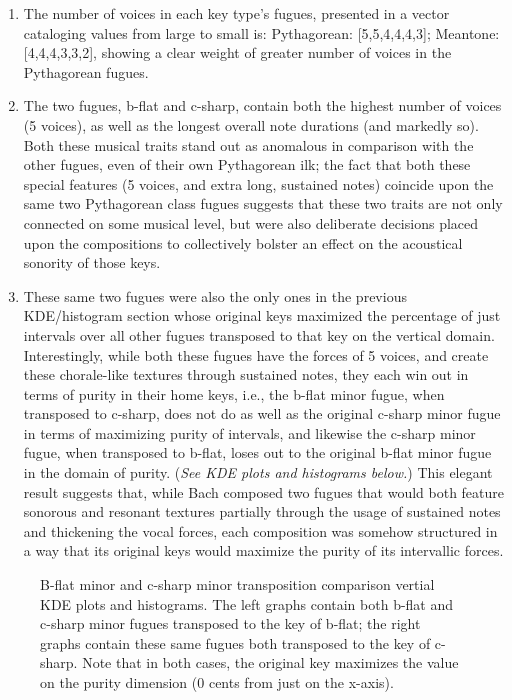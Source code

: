 \begin{enumerate}
\def\labelenumi{\arabic{enumi}.}
\tightlist
\item
  The number of voices in each key type's fugues, presented in a vector
  cataloging values from large to small is: Pythagorean:
  {[}5,5,4,4,4,3{]}; Meantone: {[}4,4,4,3,3,2{]}, showing a clear weight
  of greater number of voices in the Pythagorean fugues.
\item
  The two fugues, b-flat and c-sharp, contain both the highest number of
  voices (5 voices), as well as the longest overall note durations (and
  markedly so). Both these musical traits stand out as anomalous in
  comparison with the other fugues, even of their own Pythagorean ilk;
  the fact that both these special features (5 voices, and extra long,
  sustained notes) coincide upon the same two Pythagorean class fugues
  suggests that these two traits are not only connected on some musical
  level, but were also deliberate decisions placed upon the compositions
  to collectively bolster an effect on the acoustical sonority of those
  keys.
\item
  These same two fugues were also the only ones in the previous
  KDE/histogram section whose original keys maximized the percentage of
  just intervals over all other fugues transposed to that key on the
  vertical domain. Interestingly, while both these fugues have the
  forces of 5 voices, and create these chorale-like textures through
  sustained notes, they each win out in terms of purity in their home
  keys, i.e., the b-flat minor fugue, when transposed to c-sharp, does
  not do as well as the original c-sharp minor fugue in terms of
  maximizing purity of intervals, and likewise the c-sharp minor fugue,
  when transposed to b-flat, loses out to the original b-flat minor
  fugue in the domain of purity. (\emph{See KDE plots and histograms
  below.}) This elegant result suggests that, while Bach composed two
  fugues that would both feature sonorous and resonant textures
  partially through the usage of sustained notes and thickening the
  vocal forces, each composition was somehow structured in a way that
  its original keys would maximize the purity of its intervallic forces.
\end{enumerate}



\begin{figure}[H]
    \begin{center}
    \caption[B-flat minor and c-sharp minor transposition comparison vertial KDE plots and histograms. ]{B-flat minor and c-sharp minor transposition comparison vertial KDE plots and histograms. The left graphs contain both b-flat and c-sharp minor fugues transposed to the key of b-flat; the right graphs contain these same fugues both transposed to the key of c-sharp. Note that in both cases, the original key maximizes the value on the purity dimension (0 cents from just on the x-axis).}
    \end{center}
\end{figure}
    

